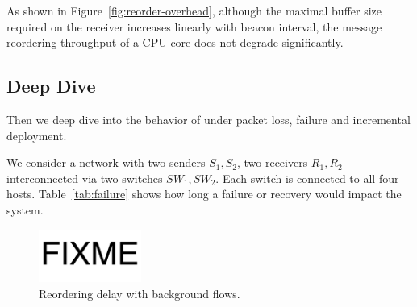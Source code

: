 As shown in Figure~\ref{fig:reorder-overhead}, although the maximal buffer size required on the receiver increases linearly with beacon interval, the message reordering throughput of a CPU core does not degrade significantly.

\subsection{Deep Dive}


Then we deep dive into the behavior of \sys under packet loss, failure and incremental deployment.

\begin{table}
\centering
{}
\caption{
	Convergence time after failure and recovery of host and switch.
	Convergence time is the time since the event occurs until end-to-end delay recovers to normal.
    Convergence time 0 indicates not affected.
    $T_{timeout}$ is the beacon timeout for failure detection.
}
\label{tab:failure}
\end{table}

We consider a network with two senders $S_1, S_2$, two receivers $R_1, R_2$ interconnected via two switches $SW_1, SW_2$.
Each switch is connected to all four hosts.
Table~\ref{tab:failure} shows how long a failure or recovery would impact the system.


\begin{figure}[t]
\centering
\includegraphics[width=0.3\textwidth]{images/fixme.pdf}
\caption{Reordering delay with background flows.}
\label{fig:background-flow}
\end{figure}

